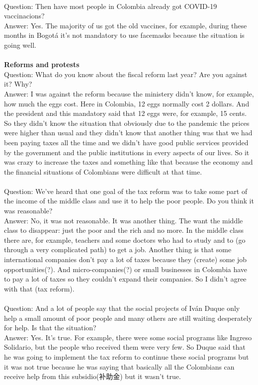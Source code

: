 \documentclass{phyasgn}\usepackage{nag}
\begin{document}
\\
Question: Then have most people in Colombia already got COVID-19 vaccinacions?\\
Answer: Yes. The majority of us got the old vaccines, for example, during these months in Bogotá it’s not mandatory to use facemasks because the situation is going well. \\
\\
\textbf{Reforms and protests}\\
Question: What do you know about the fiscal reform last year? Are you against it? Why?\\
Answer: I was against the reform because the ministery didn’t know, for example, how much the eggs cost. Here in Colombia, 12 eggs normally cost 2 dollars. And the president and this mandatory said that 12 eggs were, for example, 15 cents. So they didn’t know the situation that obviously due to the pandemic the prices were higher than usual and they didn’t know that another thing was that we had been paying taxes all the time and we didn’t have good public services provided by the government and the public institutions in every aspects of our lives. So it was crazy to increase the taxes and something like that because the economy and the financial situations of Colombians were difficult at that time. \\
\\
Question: We’ve heard that one goal of the tax reform was to take some part of the income of the middle class and use it to help the poor people. Do you think it was reasonable?\\
Answer: No, it was not reasonable. It was another thing. The want the middle class to disappear: just the poor and the rich and no more. In the middle class there are, for example, teachers and some doctors who had to study and to (go through a very complicated path) to get a job. Another thing is that some international companies don’t pay a lot of taxes because they (create) some job opportunities(?). And micro-companies(?) or small businesses in Colombia have to pay a lot of taxes so they couldn’t expand their companies. So I didn’t agree with that (tax reform).\\
\\
Question: And a lot of people say that the social projects of Iván Duque only help a small amount of poor people and many others are still waiting desperately for help. Is that the situation?\\
Answer: Yes. It’s true. For example, there were some social programs like Ingreso Solidario, but the people who received them were very few. So Duque said that he was going to implement the tax reform to continue these social programs but it was not true because he was saying that basically all the Colombians can receive help from this subsidio(补助金) but it wasn’t true. \\
\end{document}
